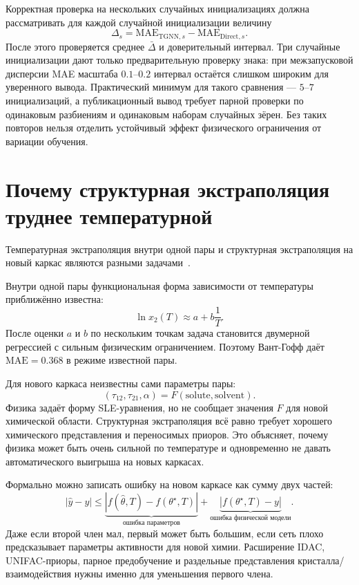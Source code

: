 \documentclass[11pt]{article}
\newcommand{\mae}{\mathrm{MAE}}
\newcommand{\abs}[1]{\left\lvert #1 \right\rvert}
\theoremstyle{definition}
\begin{document}
Корректная проверка на нескольких случайных инициализациях должна рассматривать для каждой случайной инициализации величину
\begin{equation*}
    \Delta_s
    =
    \mae_{\mathrm{TGNN},s}
    -
    \mae_{\mathrm{Direct},s}.
\end{equation*}
После этого проверяется среднее $\bar\Delta$ и доверительный интервал. Три случайные инициализации дают только предварительную проверку знака: при межзапусковой дисперсии MAE масштаба $0.1$--$0.2$ интервал остаётся слишком широким для уверенного вывода. Практический минимум для такого сравнения --- $5$--$7$ инициализаций, а публикационный вывод требует парной проверки по одинаковым разбиениям и одинаковым наборам случайных зёрен. Без таких повторов нельзя отделить устойчивый эффект физического ограничения от вариации обучения.

\section{Почему структурная экстраполяция труднее температурной}
\label{app:structural-vs-temperature}

Температурная экстраполяция внутри одной пары и структурная экстраполяция на новый каркас являются разными задачами~\cite{hildebrand1970,apelblat1999,vermeire2022}.

Внутри одной пары функциональная форма зависимости от температуры приближённо известна:
\begin{equation*}
    \ln x_2(T) \approx a+b\frac{1}{T}.
\end{equation*}
После оценки $a$ и $b$ по нескольким точкам задача становится двумерной регрессией с сильным физическим ограничением. Поэтому Вант-Гофф даёт $\mae=0.368$ в режиме известной пары.

Для нового каркаса неизвестны сами параметры пары:
\begin{equation*}
    (\tau_{12},\tau_{21},\alpha)
    =
    F(\mathrm{solute},\mathrm{solvent}).
\end{equation*}
Физика задаёт форму SLE-уравнения, но не сообщает значения $F$ для новой химической области. Структурная экстраполяция всё равно требует хорошего химического представления и переносимых приоров. Это объясняет, почему физика может быть очень сильной по температуре и одновременно не давать автоматического выигрыша на новых каркасах.

Формально можно записать ошибку на новом каркасе как сумму двух частей:
\begin{equation*}
    \abs{\widehat y-y}
    \le
    \underbrace{\abs{f(\widehat\theta,T)-f(\theta^\star,T)}}_{\text{ошибка параметров}}
    +
    \underbrace{\abs{f(\theta^\star,T)-y}}_{\text{ошибка физической модели}}.
\end{equation*}
Даже если второй член мал, первый может быть большим, если сеть плохо предсказывает параметры активности для новой химии. Расширение IDAC, UNIFAC-приоры, парное предобучение и раздельные представления кристалла/взаимодействия нужны именно для уменьшения первого члена.
\end{document}
